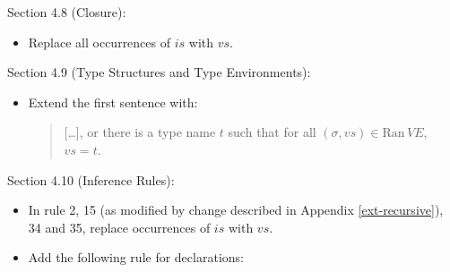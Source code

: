 \documentclass[twoside,titlepage]{article}
\begin{document}
\begin{appendix}
Section 4.8 (Closure):
\begin{itemize}
\item Replace all occurrences of $\mathit{is}$ with $\mathit{vs}$.
\end{itemize}

Section 4.9 (Type Structures and Type Environments):
\begin{itemize}
\item Extend the first sentence with:
  \begin{quote}
  [\dots], or there is a type name $t$ such that for all $(\sigma,\mathit{vs}) \in \mbox{Ran}\,\mathit{VE}$, $\mathit{vs} = t$.
  \end{quote}
\end{itemize}

Section 4.10 (Inference Rules):
\begin{itemize}
\item In rule 2, 15 (as modified by change described in Appendix \ref{ext-recursive}), 34 and 35, replace occurrences of $\mathit{is}$ with $\mathit{vs}$.

\item Add the following rule for declarations:


\end{itemize}
\end{appendix}
\end{document}
